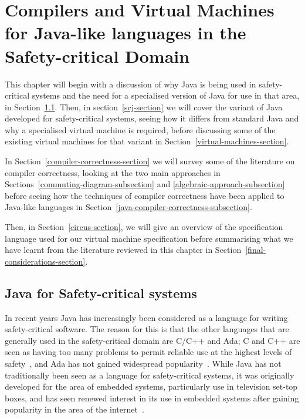 \documentclass[a4paper,10pt]{report}
\begin{document}
\chapter{Compilers and Virtual Machines for Java-like languages in the Safety-critical Domain}
\label{literature-review-chapter}

This chapter will begin with a discussion of why Java is being used in
safety-critical systems and the need for a specialised version of Java for use
in that area, in Section~\ref{java-safety-critical-section}.  Then, in
section~\ref{scj-section} we will cover the variant of Java developed for
safety-critical systems, seeing how it differs from standard Java and why a
specialised virtual machine is required, before discussing some of the existing
virtual machines for that variant in Section~\ref{virtual-machines-section}.

In Section~\ref{compiler-correctness-section} we will survey some of the
literature on compiler correctness, looking at the two main approaches in
Sections~\ref{commuting-diagram-subsection} and
\ref{algebraic-approach-subsection} before seeing how the techniques of compiler
correctness have been applied to Java-like languages in
Section~\ref{java-compiler-correctness-subsection}.

Then, in Section~\ref{circus-section}, we will give an overview of the \Circus{}
specification language used for our virtual machine specification before
summarising what we have learnt from the literature reviewed in this chapter in
Section~\ref{final-considerations-section}.

\section{Java for Safety-critical systems}
\label{java-safety-critical-section}


In recent years Java has increasingly been considered as a language for writing
safety-critical software. The reason for this is that the other languages that
are generally used in the safety-critical domain are C/C++ and Ada; C and C++ are
seen as having too many problems to permit reliable use at the highest levels of
safety~\cite{kornecki2009}, and Ada has not gained widespread
popularity~\cite{bissyande2013}.  While Java has not traditionally been seen as
a language for safety-critical systems, it was originally developed for the area
of embedded systems, particularly use in television set-top boxes, and has seen
renewed interest in its use in embedded systems after gaining popularity in the
area of the internet~\cite{mulchandani1998}.  
\end{document}
